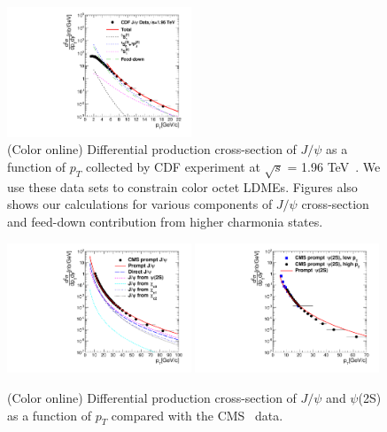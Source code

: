 \documentclass[aps,prc,preprint,superscriptaddress,showpacs,showkeys,amsmath]{revtex4-1}
\begin{document}
\begin{figure}
\includegraphics[width=0.49\textwidth]{Figures/JPsi/CDF_196TeV_D2NDPtDy_PromptJPsi_Y0025_Pt.pdf}
\caption{(Color online) Differential production cross-section of $J/\psi$ as a function of $p_{T}$ 
collected by CDF experiment at $\sqrt{s}$ = 1.96 TeV~\cite{Acosta:2004yw}. 
We use these data sets to constrain color octet LDMEs. Figures also shows our calculations for various components 
of $J/\psi$ cross-section and feed-down contribution from higher charmonia states.}
\label{Fig:LDMEJPsiCDF}
\end{figure}
\begin{figure}
\includegraphics[width=0.49\textwidth]{Fig1a_PromptJPsi_CMS_Y0012_S7TeV.pdf}
\includegraphics[width=0.49\textwidth]{Fig1b_Psi2S_CMS_Y012_S7TeV.pdf}
\caption{(Color online) Differential production cross-section of $J/\psi$ and $\psi$(2S) as a function of $p_{T}$ compared 
  with the CMS~\cite{Chatrchyan:2011kc,Khachatryan:2015rra} data.}
\label{Fig:SigmaPsi}
\end{figure}
\end{document}
